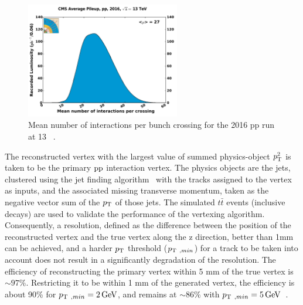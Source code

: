 		\begin{figure}[!ht]
		        \centering
		    \includegraphics[width=0.6\textwidth]{Fig/pileup_pp_2016}
		    \caption{\label{fig:MeanPU} Mean number of interactions per bunch crossing for the 2016 pp run at 13 \TeV~\cite{CMSLUMI}.}
		\end{figure}
		
	The reconstructed vertex with the largest value of summed physics-object $p_{\mathrm{T}}^2$ is taken to be the primary $\mathrm{p}\mathrm{p}$ interaction vertex. The physics objects are the jets, clustered using the jet finding algorithm~\cite{Cacciari:2008gp,Cacciari:2011ma} with the tracks assigned to the vertex as inputs, and the associated missing transverse momentum, taken as the negative vector sum of the $p_{\mathrm{T}}$ of those jets.
		The simulated $t\bar{t}$ events (inclusive decays) are used to validate the performance of the vertexing algorithm. Consequently, a resolution, defined as the difference between the position of the reconstructed vertex and the true vertex along the z direction, better than 1\unit{mm} can be achieved, and a harder $p_{\mathrm{T}}$ threshold ($p_{\mathrm{T}}\ _{,min}$) for a track to be taken into account does not result in a significantly degradation of the resolution.
		The efficiency of reconstructing the primary vertex within 5 mm of the true vertex is $\sim 97\%$. Restricting it to be within 1 mm of the generated vertex, the efficiency is about 90\% for $p_{\mathrm{T}}\ _{,min} = 2\,\text{Ge\hspace{-.08em}V}$, and remains at $\sim 86\%$ with $p_{\mathrm{T}}\ _{,min} = 5\,\text{Ge\hspace{-.08em}V}$~\cite{Contardo:2020886}.